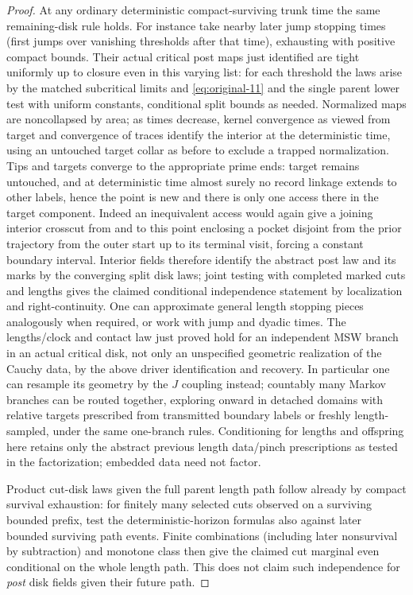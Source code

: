 \begin{proof}
At any ordinary deterministic compact-surviving trunk time the same remaining-disk rule holds.
For instance take nearby later jump stopping times (first jumps over vanishing thresholds after that time), exhausting with positive compact bounds.
Their actual critical post maps just identified are tight uniformly up to closure even in this varying list: for each threshold the laws arise by the matched subcritical limits and \eqref{eq:original-11} and the single parent lower test with uniform constants, conditional split bounds as needed.
Normalized maps are noncollapsed by area; as times decrease, kernel convergence as viewed from target and convergence of traces identify the interior at the deterministic time, using an untouched target collar as before to exclude a trapped normalization.
Tips and targets converge to the appropriate prime ends: target remains untouched, and at deterministic time almost surely no record linkage extends to other labels, hence the point is new and there is only one access there in the target component.
Indeed an inequivalent access would again give a joining interior crosscut from and to this point enclosing a pocket disjoint from the prior trajectory from the outer start up to its terminal visit, forcing a constant boundary interval.
Interior fields therefore identify the abstract post law and its marks by the converging split disk laws; joint testing with completed marked cuts and lengths gives the claimed conditional independence statement by localization and right-continuity.
One can approximate general length stopping pieces analogously when required, or work with jump and dyadic times.
The lengths/clock and contact law just proved hold for an independent MSW branch in an actual critical disk, not only an unspecified geometric realization of the Cauchy data, by the above driver identification and recovery.
In particular one can resample its geometry by the \(J\) coupling instead; countably many Markov branches can be routed together, exploring onward in detached domains with relative targets prescribed from transmitted boundary labels or freshly length-sampled, under the same one-branch rules.
Conditioning for lengths and offspring here retains only the abstract previous length data/pinch prescriptions as tested in the factorization; embedded data need not factor.

Product cut-disk laws given the full parent length path follow already by compact survival exhaustion: for finitely many selected cuts observed on a surviving bounded prefix, test the deterministic-horizon formulas also against later bounded surviving path events.
Finite combinations (including later nonsurvival by subtraction) and monotone class then give the claimed cut marginal even conditional on the whole length path.
This does not claim such independence for \emph{post} disk fields given their future path.


\end{proof}

